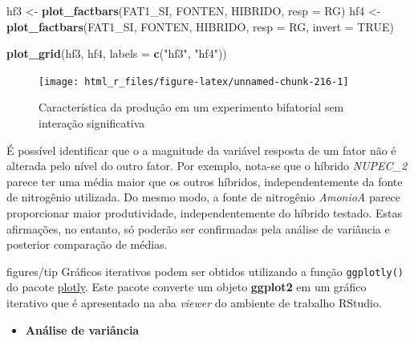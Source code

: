 \documentclass[
]{book}
\newenvironment{Shaded}{\begin{snugshade}}{\end{snugshade}}
\newcommand{\DataTypeTok}[1]{\textcolor[rgb]{0.13,0.29,0.53}{#1}}
\newcommand{\KeywordTok}[1]{\textcolor[rgb]{0.13,0.29,0.53}{\textbf{#1}}}
\newcommand{\NormalTok}[1]{#1}
\newcommand{\OtherTok}[1]{\textcolor[rgb]{0.56,0.35,0.01}{#1}}
\newcommand{\StringTok}[1]{\textcolor[rgb]{0.31,0.60,0.02}{#1}}
\providecommand{\tightlist}{%
  \setlength{\itemsep}{0pt}\setlength{\parskip}{0pt}}
\numberwithin{equation}{section}
\newcommand{\indt}[1]{\index{#1|ST}}
\newenvironment{dica}
  {\begin{customBlockImage}[colframe=customBlue, title=Dica]{figures/tip}}
  {\end{customBlockImage}}
\begin{document}
\begin{Shaded}
\begin{Highlighting}[]
\NormalTok{hf3 \textless{}{-}}\StringTok{ }\KeywordTok{plot\_factbars}\NormalTok{(FAT1\_SI,}
\NormalTok{                     FONTEN,}
\NormalTok{                     HIBRIDO,}
                     \DataTypeTok{resp =}\NormalTok{ RG)}
\NormalTok{hf4 \textless{}{-}}\StringTok{ }\KeywordTok{plot\_factbars}\NormalTok{(FAT1\_SI,}
\NormalTok{                     FONTEN,}
\NormalTok{                     HIBRIDO,}
                     \DataTypeTok{resp =}\NormalTok{ RG,}
                     \DataTypeTok{invert =} \OtherTok{TRUE}\NormalTok{)}

\KeywordTok{plot\_grid}\NormalTok{(hf3, hf4, }\DataTypeTok{labels =} \KeywordTok{c}\NormalTok{(}\StringTok{"hf3"}\NormalTok{, }\StringTok{"hf4"}\NormalTok{))}
\end{Highlighting}
\end{Shaded}

\begin{figure}

{\centering \texttt{[image: html\_r\_files/figure-latex/unnamed-chunk-216-1]} 

}

\caption{Característica da produção em um experimento bifatorial sem interação significativa}\label{fig:unnamed-chunk-216}
\end{figure}

É possível identificar que o a magnitude da variável resposta de um fator não é alterada pelo nível do outro fator. Por exemplo, nota-se que o híbrido \emph{NUPEC\_2} parece ter uma média maior que os outros híbridos, independentemente da fonte de nitrogênio utilizada. Do mesmo modo, a fonte de nitrogênio \emph{AmonioA} parece proporcionar maior produtividade, independentemente do híbrido testado. Estas afirmações, no entanto, só poderão ser confirmadas pela análise de variância e posterior comparação de médias.

\indt{Dicas}
\begin{dica}
Gráficos iterativos podem ser obtidos utilizando a função \texttt{ggplotly()} do pacote \href{https://plot.ly/ggplot2/}{plotly}. Este pacote converte um objeto \textbf{ggplot2} em um gráfico iterativo que é apresentado na aba \emph{viewer} do ambiente de trabalho RStudio.
\end{dica}

\begin{itemize}
\tightlist
\item
  \textbf{Análise de variância}
\end{itemize}
\end{document}
